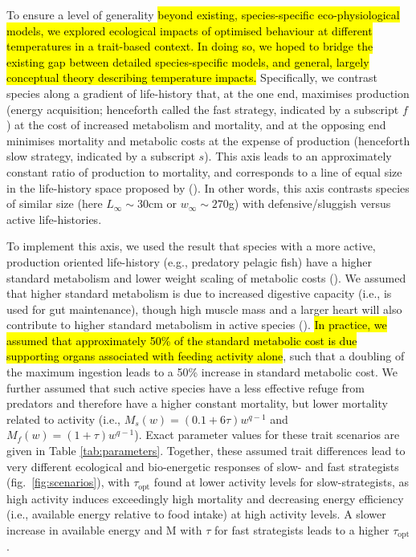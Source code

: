 \documentclass[11pt]{article}\usepackage[]{graphicx}\usepackage[]{color,soul}
\begin{document}
To ensure a level of generality \hl{beyond existing, species-specific eco-physiological models, we explored ecological impacts of optimised behaviour at different temperatures in a trait-based context. In doing so, we hoped to bridge the existing gap between detailed species-specific models, and general, largely conceptual theory describing temperature impacts.} 
Specifically, we contrast species along a gradient of life-history that, at the one end, maximises production (energy acquisition; henceforth called the fast strategy, indicated by a subscript $f$) at the cost of increased metabolism and mortality, and at the opposing end minimises mortality and metabolic costs at the expense of production (henceforth slow strategy, indicated by a subscript $s$). This axis leads to an approximately constant ratio of production to mortality, and corresponds to a line of equal size in the life-history space proposed by \citeauthor{charnov_evolutionary_2013} (\citeyear{charnov_evolutionary_2013}). In other words, this axis contrasts species of similar size (here $L_{\infty}\sim 30$cm or $w_{\infty}\sim 270$g) with defensive/sluggish versus active life-histories.

To implement this axis, we used the result that species with a more
active, production oriented life-history (e.g., predatory pelagic
fish) have a higher standard metabolism and lower weight scaling of
metabolic costs
(\citealt{priede_metabolic_1985,killen_intraspecific_2010}). We assumed
that higher standard metabolism is due to increased digestive capacity
(i.e., is used for gut maintenance), though high muscle mass and a
larger heart will also contribute to higher standard metabolism in
active species (\citealt{priede_metabolic_1985}). \hl{In practice, we assumed
that approximately 50\% of the standard metabolic cost is due supporting organs associated with feeding activity alone}, such that a doubling of the maximum ingestion leads to a
50\% increase in standard metabolic cost. We further assumed that such active species have a less effective refuge from predators and therefore have a higher constant mortality, but lower mortality related to activity (i.e., $M_{s}(w) = (0.1+6\tau) w^{q-1}$ and $M_{f}(w) = (1+\tau) w^{q-1}$). Exact parameter values for these trait scenarios are given in Table \ref{tab:parameters}. Together, these assumed trait differences lead to very different ecological and bio-energetic responses of slow- and fast strategists (fig.~\ref{fig:scenarios}), with $\tau_{\text{opt}}$ found at lower activity levels for slow-strategists, as high activity induces exceedingly high mortality and decreasing energy efficiency (i.e., available energy relative to food intake) at high activity levels. A slower increase in available energy and M with $\tau$ for fast strategists leads to a higher $\tau_{\text{opt}}$.
\end{document}
